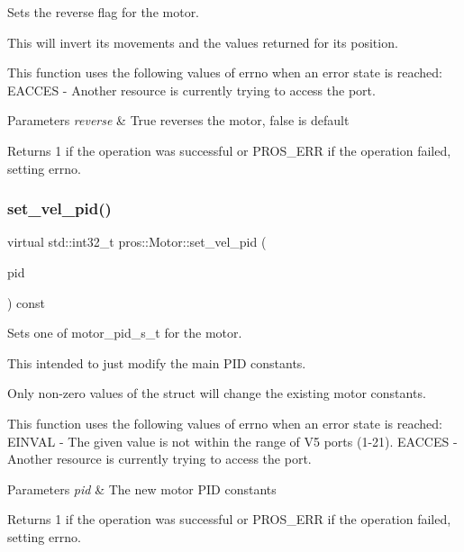 Sets the reverse flag for the motor. 

This will invert its movements and the values returned for its position.

This function uses the following values of errno when an error state is reached\+: E\+A\+C\+C\+ES -\/ Another resource is currently trying to access the port.


\begin{DoxyParams}{Parameters}
{\em reverse} & True reverses the motor, false is default\\
\hline
\end{DoxyParams}
\begin{DoxyReturn}{Returns}
1 if the operation was successful or P\+R\+O\+S\+\_\+\+E\+RR if the operation failed, setting errno. 
\end{DoxyReturn}
\mbox{\label{classpros_1_1Motor_a69169ae0cd2b7f68ee533648c7830397}} 
\subsubsection{\texorpdfstring{set\_vel\_pid()}{set\_vel\_pid()}}
{\footnotesize\ttfamily virtual std\+::int32\+\_\+t pros\+::\+Motor\+::set\+\_\+vel\+\_\+pid (\begin{DoxyParamCaption}\item[{const \mbox{\hyperlink{motors_8h_ad2e907c8d7ce53c1fd91f1b9801072e3}{motor\+\_\+pid\+\_\+s\+\_\+t}}}]{pid }\end{DoxyParamCaption}) const\hspace{0.3cm}{\ttfamily [virtual]}}



Sets one of motor\+\_\+pid\+\_\+s\+\_\+t for the motor. 

This intended to just modify the main P\+ID constants.

Only non-\/zero values of the struct will change the existing motor constants.

This function uses the following values of errno when an error state is reached\+: E\+I\+N\+V\+AL -\/ The given value is not within the range of V5 ports (1-\/21). E\+A\+C\+C\+ES -\/ Another resource is currently trying to access the port.


\begin{DoxyParams}{Parameters}
{\em pid} & The new motor P\+ID constants\\
\hline
\end{DoxyParams}
\begin{DoxyReturn}{Returns}
1 if the operation was successful or P\+R\+O\+S\+\_\+\+E\+RR if the operation failed, setting errno. 
\end{DoxyReturn}
\mbox{\label{classpros_1_1Motor_a7fc8eefc04c8b8aaefad75437b49f30a}} 
